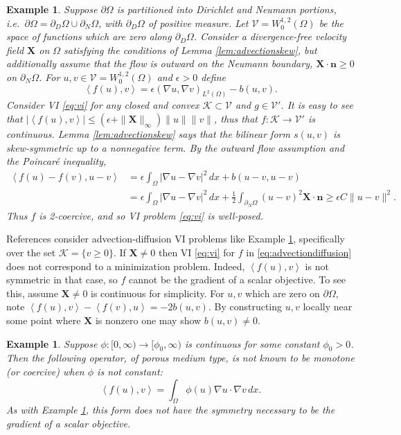 \documentclass[letterpaper,final,12pt,reqno]{amsart}
\theoremstyle{cstyle}
\theoremstyle{cstyle*}
\theoremstyle{dstyle}
\newtheorem{example}[theorem]{Example}
\numberwithin{equation}{section}
\numberwithin{figure}{section}
\numberwithin{table}{section}
\numberwithin{theorem}{section}
\newcommand{\eps}{\epsilon}
\newcommand{\grad}{\nabla}
\newcommand{\bn}{\mathbf{n}}
\newcommand{\bX}{\mathbf{X}}
\newcommand{\cK}{\mathcal{K}}
\newcommand{\cV}{\mathcal{V}}
\newcommand{\ip}[2]{\left<#1,#2\right>}
\begin{document}
\begin{example}  \label{ex:advectiondiffusion}  Suppose $\partial\Omega$ is partitioned into Dirichlet and Neumann portions, i.e.~$\partial\Omega = \partial_D\Omega \cup \partial_N\Omega$, with $\partial_D\Omega$ of positive measure.  Let $\cV = W_0^{1,2}(\Omega)$ be the space of functions which are zero along $\partial_D\Omega$.  Consider a divergence-free velocity field $\bX$ on $\Omega$ satisfying the conditions of Lemma \ref{lem:advectionskew}, but additionally assume that the flow is outward on the Neumann boundary, $\bX \cdot \bn \ge 0$ on $\partial_N\Omega$.  For $u,v \in \cV = W_0^{1,2}(\Omega)$ and $\eps>0$ define
\begin{equation}
\ip{f(u)}{v} = \eps \left(\grad u, \grad v\right)_{L^2(\Omega)} - b(u,v). \label{eq:advectiondiffusion}
\end{equation}
Consider VI \eqref{eq:vi} for any closed and convex $\cK \subset \cV$ and $g\in\cV'$.  It is easy to see that $|\ip{f(u)}{v}| \le (\eps + \|\bX\|_\infty) \|u\| \|v\|$, thus that $f:\cK \to \cV'$ is continuous.  Lemma \ref{lem:advectionskew} says that the bilinear form $s(u,v)$ is skew-symmetric up to a nonnegative term.  By the outward flow assumption and the Poincar\'e inequality,
\begin{align*}
\ip{f(u)-f(v)}{u-v} &= \eps \int_\Omega |\grad u - \grad v|^2\,dx + b(u-v,u-v) \\
                    &= \eps \int_\Omega |\grad u - \grad v|^2\,dx + \frac{1}{2} \int_{\partial_N\Omega} (u-v)^2 \bX\cdot\bn \ge \eps C \|u-v\|^2.
\end{align*}
Thus $f$ is 2-coercive, and so VI problem \eqref{eq:vi} is well-posed.
\end{example}

References \cite{Bueler2021conservation,ChangNakshatrala2017} consider advection-diffusion VI problems like Example \ref{ex:advectiondiffusion}, specifically over the set $\cK = \{v\ge 0\}$.  If $\bX \ne 0$ then VI \eqref{eq:vi} for $f$ in \eqref{eq:advectiondiffusion} does not correspond to a minimization problem.  Indeed, $\ip{f(u)}{v}$ is not symmetric in that case, so $f$ cannot be the gradient of a scalar objective.  To see this, assume $\bX \ne 0$ is continuous for simplicity.  For $u,v$ which are zero on $\partial \Omega$, note $\ip{f(u)}{v} - \ip{f(v)}{u} = -2 b(u,v)$.  By constructing $u,v$ locally near some point where $\bX$ is nonzero one may show $b(u,v)\ne 0$.

\begin{example}  \label{ex:porous}  Suppose $\phi:[0,\infty) \to [\phi_0,\infty)$ is continuous for some constant $\phi_0>0$.  Then the following operator, of porous medium type, is not known to be monotone (or coercive) when $\phi$ is not constant:
\begin{equation}
\ip{f(u)}{v} = \int_\Omega \phi(u) \grad u \cdot \grad v\,dx. \label{eq:porous}
\end{equation}
As with Example \ref{ex:advectiondiffusion}, this form does not have the symmetry necessary to be the gradient of a scalar objective.
\end{example}
\end{document}
